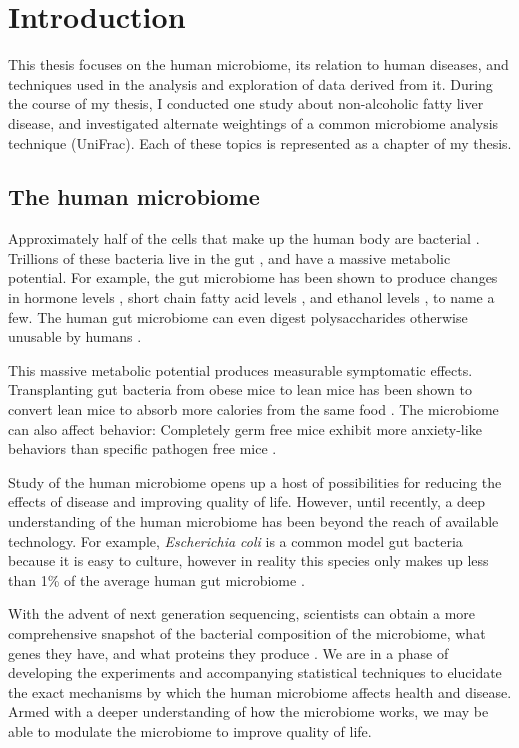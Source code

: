 \chapter{Introduction}
This thesis focuses on the human microbiome, its relation to human diseases, and techniques used in the analysis and exploration of data derived from it. During the course of my thesis, I conducted one study about non-alcoholic fatty liver disease, and investigated alternate weightings of a common microbiome analysis technique (UniFrac). Each of these topics is represented as a chapter of my thesis.

\section{The human microbiome}
Approximately half of the cells that make up the human body are bacterial \cite{sender2016revised}. Trillions of these bacteria live in the gut \cite{guarner2003gut}, and have a massive metabolic potential. For example, the gut microbiome has been shown to produce changes in hormone levels \cite{markle2013sex}, short chain fatty acid levels \cite{turnbaugh2008diet}, and ethanol levels \cite{krebs1970physiological}, to name a few. The human gut microbiome can even digest polysaccharides otherwise unusable by humans \cite{flint2008polysaccharide}.

This massive metabolic potential produces measurable symptomatic effects. Transplanting gut bacteria from obese mice to lean mice has been shown to convert lean mice to absorb more calories from the same food \cite{turnbaugh2006obesity}. The microbiome can also affect behavior: Completely germ free mice exhibit more anxiety-like behaviors than specific pathogen free mice \cite{neufeld2011reduced}.

Study of the human microbiome opens up a host of possibilities for reducing the effects of disease and improving quality of life. However, until recently, a deep understanding of the human microbiome has been beyond the reach of available technology. For example, \textit{Escherichia coli} is a common model gut bacteria because it is easy to culture, however in reality this species only makes up less than 1\% of the average human gut microbiome \cite{arumugam2011enterotypes}.

With the advent of next generation sequencing, scientists can obtain a more comprehensive snapshot of the bacterial composition of the microbiome, what genes they have, and what proteins they produce \cite{di2013high}. We are in a phase of developing the experiments and accompanying statistical techniques to elucidate the exact mechanisms by which the human microbiome affects health and disease. Armed with a deeper understanding of how the microbiome works, we may be able to modulate the microbiome to improve quality of life.


